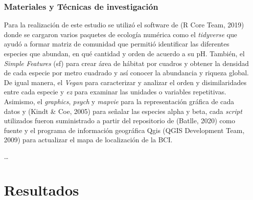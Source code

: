 \documentclass[11pt,]{article}
\begin{document}
\subsubsection{Materiales y Técnicas de
investigación}\label{materiales-y-tuxe9cnicas-de-investigaciuxf3n}

Para la realización de este estudio se utilizó el software de (R Core
Team, 2019) donde se cargaron varios paquetes de ecología numérica como
el \emph{tidyverse} que ayudó a formar matriz de comunidad que permitió
identificar las diferentes especies que abundan, en qué cantidad y orden
de acuerdo a su pH. También, el \emph{Simple Features} (sf) para crear
área de hábitat por cuadros y obtener la densidad de cada especie por
metro cuadrado y así conocer la abundancia y riqueza global. De igual
manera, el \emph{Vegan} para caracterizar y analizar el orden y
disimilaridades entre cada especie y \emph{ez} para examinar las
unidades o variables repetitivas. Asimismo, el \emph{graphics},
\emph{psych} y \emph{mapvie} para la representación gráfica de cada
datos y (Kindt \& Coe, 2005) para señalar las especies alpha y beta,
cada \emph{script} utilizados fueron suministrado a partir del
repositorio de (Batlle, 2020) como fuente y el programa de información
geográfica Qgis (QGIS Development Team, 2009) para actualizar el mapa de
localización de la BCI.

\ldots

\section{Resultados}\label{resultados}
\end{document}
